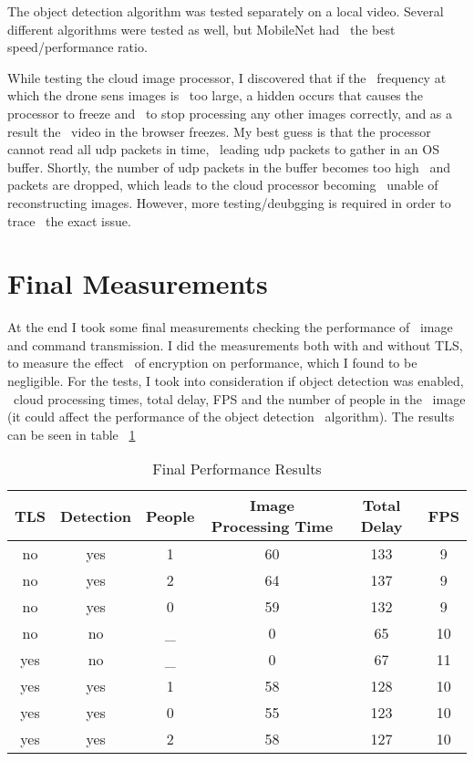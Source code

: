 The object detection algorithm was tested separately on a local video.
Several different algorithms were tested as well, but MobileNet had \
the best speed/performance ratio.

While testing the cloud image processor, I discovered that if the \
frequency at which the drone sens images is \
too large, a hidden occurs that causes the processor to freeze and \
to stop processing any other images correctly, and as a result the \
video in the browser freezes.
My best guess is that the processor cannot read all udp packets in time, \
leading udp packets to gather in an OS buffer.
Shortly, the number of udp packets in the buffer becomes too high \
and packets are dropped, which leads to the cloud processor becoming \
unable of reconstructing images.
However, more testing/deubgging is required in order to trace \
the exact issue.

\section{Final Measurements}
\label{sec:final-measurements}

At the end I took some final measurements checking the performance of \
image and command transmission.
I did the measurements both with and without TLS, to measure the effect \
of encryption on performance, which I found to be negligible.
For the tests, I took into consideration if object detection was enabled, \
cloud processing times, total delay, FPS and the number of people in the \
image (it could affect the performance of the object detection \
algorithm).
The results can be seen in table ~\ref{tab:final-results}

\begin{table}[ht]
    \caption{Final Performance Results}
    \centering
    \begin{tabular}{|c|c|c|c|c|c|}
        \hline\hline
        TLS & Detection & People & Image Processing Time & Total Delay & FPS \\
        \hline
        no  & yes & 1   & 60 & 133  & 9 \\
        no  & yes & 2   & 64 & 137  & 9 \\
        no  & yes & 0   & 59 & 132  & 9 \\
        no  & no  & \_  & 0  & 65   & 10 \\
        yes & no  & \_  & 0  & 67   & 11 \\
        yes & yes & 1   & 58 & 128  & 10 \\
        yes & yes & 0   & 55 & 123  & 10 \\
        yes & yes & 2   & 58 & 127  & 10 \\
        \hline
    \end{tabular}
    \label{tab:final-results}
\end{table}

